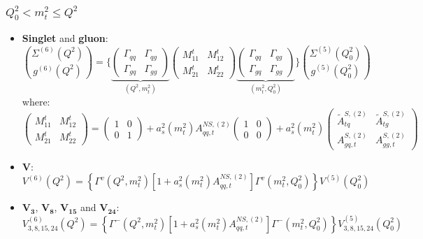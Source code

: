 \documentclass[10pt,a4paper]{article}
\begin{document}
\subsubsection{$Q_0^2<m_t^2\leq Q^2$}
\begin{itemize}
\item \textbf{Singlet} and \textbf{gluon}:
\begin{equation}
{\Sigma^{(6)}(Q^2) \choose g^{(6)}(Q^2)} = \Bigg\{\underbrace{\begin{pmatrix} \Gamma_{qq} & \Gamma_{qg} \\ \Gamma_{gq}& \Gamma_{gg}\end{pmatrix}}_{(Q^2,m_t^2)}\begin{pmatrix} M_{11}^t & M_{12}^t \\ M_{21}^t & M_{22}^t\end{pmatrix}\underbrace{\begin{pmatrix} \Gamma_{qq}& \Gamma_{qg} \\ \Gamma_{gq}& \Gamma_{gg}\end{pmatrix}}_{(m_t^2,Q_0^2)}\Bigg\}{\Sigma^{(5)}(Q_0^2) \choose g^{(5)}(Q_0^2)}
\end{equation}
where:
\begin{equation}
\begin{pmatrix} M_{11}^t & M_{12}^t \\ M_{21}^t & M_{22}^t\end{pmatrix}=\begin{pmatrix} 1 & 0 \\ 0 & 1\end{pmatrix}+a_s^2(m_t^2)A_{qq,t}^{N\!S,(2)}\begin{pmatrix} 1 & 0 \\ 0 & 0\end{pmatrix}+a_s^2(m_t^2)\begin{pmatrix} \tilde{A}^{S,(2)}_{tq} & \tilde{A}^{S,(2)}_{tg} \\A^{S,(2)}_{gq,t} & A_{gg,t}^{S,(2)}\end{pmatrix}
\end{equation}
\item $\mathbf{V}$:
\begin{equation}
V^{(6)}(Q^2)=\left\{\Gamma^{v}(Q^2,m_t^2)[1+a_s^2(m_t^2)A_{qq,t}^{N\!S,(2)}]\Gamma^{v}(m_t^2,Q_0^2)\right\}V^{(5)}(Q^2_0)
\end{equation}
\item $\mathbf{V_3}$, $\mathbf{V_8}$, $\mathbf{V_{15}}$ and $\mathbf{V_{24}}$:
\begin{equation}
V^{(6)}_{3,8,15,24}(Q^2)=\left\{\Gamma^{-}(Q^2,m_t^2)[1+a_s^2(m_t^2)A_{qq,t}^{N\!S,(2)}]\Gamma^{-}(m_t^2,Q_0^2)\right\}V^{(5)}_{3,8,15,24}(Q^2_0)

\end{equation}
\end{itemize}
\end{document}
